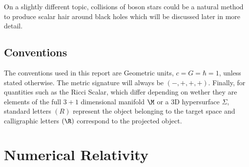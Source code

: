 On a slightly different topic, collisions of boson stars could be a natural method to produce scalar hair around black holes which will be discussed later in more detail. 

\subsection{Conventions}
The conventions used in this report are Geometric units, $c=G=\hbar=1$, unless stated otherwise. The metric signature will always be $(-,+,+,+)$. Finally, for quantities such as the Ricci Scalar, which differ depending on wether they are elements of the full $3+1$ dimensional manifold $\M$ or a $3$D hypersurface $\Sigma$, standard letters $(R)$ represent the object belonging to the target space and calligraphic letters $(\R)$ correspond to the projected object.




\section{Numerical Relativity}
